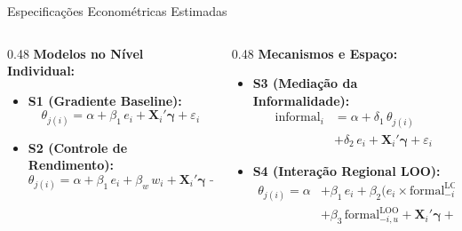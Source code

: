 \documentclass[aspectratio=169, 10pt]{beamer}
\begin{document}
\begin{frame}{Especificações Econométricas Estimadas}
    \begin{columns}[T]
        \begin{column}{0.48\textwidth}
            \textbf{Modelos no Nível Individual:}
            \vspace{0.2em}
            \begin{itemize}
                \item \textbf{S1 (Gradiente Baseline):}
                \begin{equation*}
                    \theta_{j(i)} = \alpha + \beta_1 \, e_i + \mathbf{X}_i'\boldsymbol{\gamma} + \varepsilon_i
                \end{equation*}

                \item \textbf{S2 (Controle de Rendimento):}
                \begin{equation*}
                    \theta_{j(i)} = \alpha + \beta_1 \, e_i + \beta_w \, w_i + \mathbf{X}_i'\boldsymbol{\gamma} + \varepsilon_i
                \end{equation*}
            \end{itemize}
        \end{column}

        \begin{column}{0.48\textwidth}
            \textbf{Mecanismos e Espaço:}
            \vspace{0.2em}
            \begin{itemize}
                \item \textbf{S3 (Mediação da Informalidade):}
                \begin{align*}
                    \text{informal}_i &= \alpha + \delta_1 \, \theta_{j(i)} \\
                    &+ \delta_2 \, e_i + \mathbf{X}_i'\boldsymbol{\gamma} + \varepsilon_i
                \end{align*}

                \item \textbf{S4 (Interação Regional LOO):}
                \begin{align*}
                    \theta_{j(i)} = \alpha &+ \beta_1 \, e_i + \beta_2 \big(e_i \times \text{formal}_{-i, u}^{\text{LOO}}\big) \\
                    &+ \beta_3 \, \text{formal}_{-i, u}^{\text{LOO}} + \mathbf{X}_i'\boldsymbol{\gamma} + \varepsilon_i
                \end{align*}
            \end{itemize}
        \end{column}
    \end{columns}
\end{frame}
\end{document}
